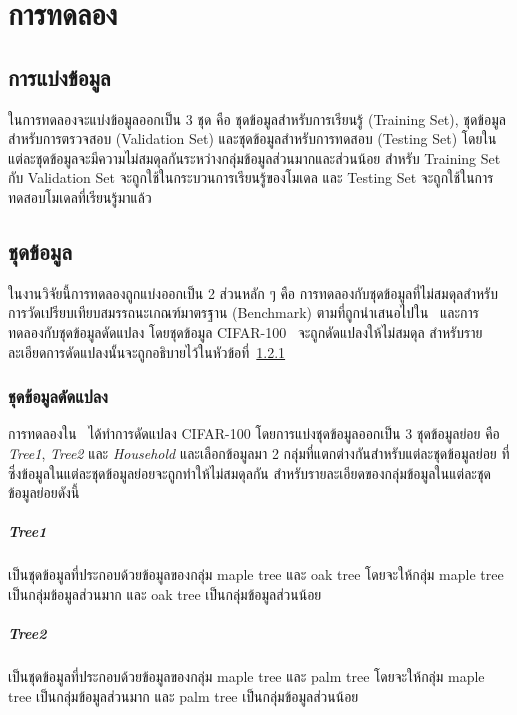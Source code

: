\chapter{การทดลอง}
\label{chapter:result}

\section{การแบ่งข้อมูล}
ในการทดลองจะแบ่งข้อมูลออกเป็น 3 ชุด คือ ชุดข้อมูลสำหรับการเรียนรู้ (Training Set), ชุดข้อมูลสำหรับการตรวจสอบ (Validation Set) และชุดข้อมูลสำหรับการทดสอบ (Testing Set) โดยในแต่ละชุดข้อมูลจะมีความไม่สมดุลกันระหว่างกลุ่มข้อมูลส่วนมากและส่วนน้อย สำหรับ Training Set กับ Validation Set จะถูกใช้ในกระบวนการเรียนรู้ของโมเดล และ Testing Set จะถูกใช้ในการทดสอบโมเดลที่เรียนรู้มาแล้ว

\section{ชุดข้อมูล}

ในงานวิจัยนี้การทดลองถูกแบ่งออกเป็น 2 ส่วนหลัก ๆ คือ การทดลองกับชุดข้อมูลที่ไม่สมดุลสำหรับการวัดเปรียบเทียบสมรรถนะเกณฑ์มาตรฐาน (Benchmark) ตามที่ถูกนำเสนอไปใน~\cite{Ding:2011} และการทดลองกับชุดข้อมูลดัดแปลง โดยชุดข้อมูล CIFAR-100~\cite{Krizhevsky:2009} จะถูกดัดแปลงให้ไม่สมดุล สำหรับรายละเอียดการดัดแปลงนั้นจะถูกอธิบายไว้ในหัวข้อที่~\ref{ex:modified_dataset}

\subsection{ชุดข้อมูลดัดแปลง} \label{ex:modified_dataset}
การทดลองใน~\cite{Wang:2016} ได้ทำการดัดแปลง CIFAR-100 โดยการแบ่งชุดข้อมูลออกเป็น 3 ชุดข้อมูลย่อย คือ \emph{Tree1}, \emph{Tree2} และ \emph{Household} และเลือกข้อมูลมา 2 กลุ่มที่แตกต่างกันสำหรับแต่ละชุดข้อมูลย่อย ที่ซึ่งข้อมูลในแต่ละชุดข้อมูลย่อยจะถูกทำให้ไม่สมดุลกัน สำหรับรายละเอียดของกลุ่มข้อมูลในแต่ละชุดข้อมูลย่อยดังนี้

\paragraph{\emph{Tree1}}
เป็นชุดข้อมูลที่ประกอบด้วยข้อมูลของกลุ่ม maple tree และ oak tree โดยจะให้กลุ่ม maple tree เป็นกลุ่มข้อมูลส่วนมาก และ oak tree เป็นกลุ่มข้อมูลส่วนน้อย

\paragraph{\emph{Tree2}}
เป็นชุดข้อมูลที่ประกอบด้วยข้อมูลของกลุ่ม maple tree และ palm tree โดยจะให้กลุ่ม maple tree เป็นกลุ่มข้อมูลส่วนมาก และ palm tree เป็นกลุ่มข้อมูลส่วนน้อย

